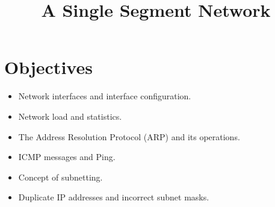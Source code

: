 \documentclass{UTNetLab}
\title{A Single Segment Network}
\begin{document}
	 
	 \section*{Objectives}
	 \begin{itemize}
	 	\item Network interfaces and interface configuration.
	 	\item Network load and statistics.
	 	\item The Address Resolution Protocol (ARP) and its operations.
	 	\item ICMP messages and Ping.
	 	\item Concept of subnetting.
	 	\item Duplicate IP addresses and incorrect subnet masks.
	 \end{itemize}
 
\end{document}
